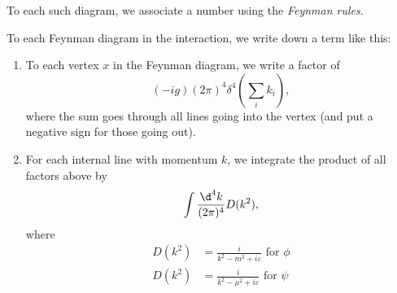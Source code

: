 \documentclass[a4paper]{article}
\begin{document}
To each such diagram, we associate a number using the \emph{Feynman rules}.
\begin{defi}
  To each Feynman diagram in the interaction, we write down a term like this:
  \begin{enumerate}
    \item To each vertex $x$ in the Feynman diagram, we write a factor of
      \[
        (-ig)(2\pi)^4 \delta^4\left(\sum_i k_i\right),
      \]
      where the sum goes through all lines going into the vertex (and put a negative sign for those going out).
    \item For each internal line with momentum $k$, we integrate the product of all factors above by
      \[
        \int \frac{\d^4 k}{(2\pi)^4} D(k^2),
      \]
      where
      \begin{align*}
        D(k^2) &= \frac{i}{k^2 - m^2 + i\varepsilon}\text{ for }\phi\\
        D(k^2) &= \frac{i}{k^2 - \mu^2 + i\varepsilon}\text{ for }\psi
      \end{align*}
  \end{enumerate}
\end{defi}
\end{document}
